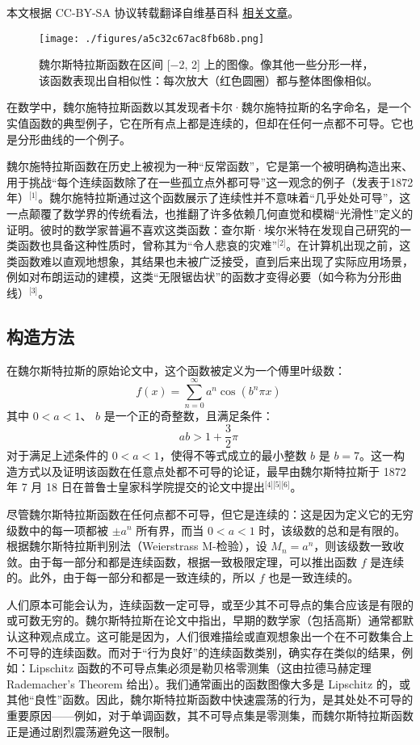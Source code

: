 
本文根据 CC-BY-SA 协议转载翻译自维基百科 \href{https://en.wikipedia.org/wiki/Weierstrass_function}{相关文章}。

\begin{figure}[ht]
\centering
\texttt{[image: ./figures/a5c32c67ac8fb68b.png]}
\caption{魏尔斯特拉斯函数在区间 [−2, 2] 上的图像。像其他一些分形一样，该函数表现出自相似性：每次放大（红色圆圈）都与整体图像相似。} \label{fig_WRST_1}
\end{figure}
在数学中，魏尔施特拉斯函数以其发现者卡尔·魏尔施特拉斯的名字命名，是一个实值函数的典型例子，它在所有点上都是连续的，但却在任何一点都不可导。它也是分形曲线的一个例子。

魏尔施特拉斯函数在历史上被视为一种“反常函数”，它是第一个被明确构造出来、用于挑战“每个连续函数除了在一些孤立点外都可导”这一观念的例子（发表于1872年）\(^\text{[1]}\)。魏尔施特拉斯通过这个函数展示了连续性并不意味着“几乎处处可导”，这一点颠覆了数学界的传统看法，也推翻了许多依赖几何直觉和模糊“光滑性”定义的证明。彼时的数学家普遍不喜欢这类函数：查尔斯·埃尔米特在发现自己研究的一类函数也具备这种性质时，曾称其为“令人悲哀的灾难”\(^\text{[2]}\)。在计算机出现之前，这类函数难以直观地想象，其结果也未被广泛接受，直到后来出现了实际应用场景，例如对布朗运动的建模，这类“无限锯齿状”的函数才变得必要（如今称为分形曲线）\(^\text{[3]}\)。
\subsection{构造方法}
在魏尔斯特拉斯的原始论文中，这个函数被定义为一个傅里叶级数：
$$
f(x) = \sum_{n=0}^{\infty} a^n \cos(b^n \pi x)~
$$
其中
$0 < a < 1$、
$b$ 是一个正的奇整数，且满足条件：
$$
ab > 1 + \frac{3}{2}\pi~
$$
对于满足上述条件的 $0 < a < 1$，使得不等式成立的最小整数 $b$ 是 $b = 7$。这一构造方式以及证明该函数在任意点处都不可导的论证，最早由魏尔斯特拉斯于 1872 年 7 月 18 日在普鲁士皇家科学院提交的论文中提出\(^\text{[4][5][6]}\)。

尽管魏尔斯特拉斯函数在任何点都不可导，但它是连续的：这是因为定义它的无穷级数中的每一项都被 $\pm a^n$ 所有界，而当 $0 < a < 1$ 时，该级数的总和是有限的。根据魏尔斯特拉斯判别法（Weierstrass M-检验），设 $M_n = a^n$，则该级数一致收敛。由于每一部分和都是连续函数，根据一致极限定理，可以推出函数 $f$ 是连续的。此外，由于每一部分和都是一致连续的，所以 $f$ 也是一致连续的。

人们原本可能会认为，连续函数一定可导，或至少其不可导点的集合应该是有限的或可数无穷的。魏尔斯特拉斯在论文中指出，早期的数学家（包括高斯）通常都默认这种观点成立。这可能是因为，人们很难描绘或直观想象出一个在不可数集合上不可导的连续函数。而对于“行为良好”的连续函数类别，确实存在类似的结果，例如：Lipschitz 函数的不可导点集必须是勒贝格零测集（这由拉德马赫定理 Rademacher's Theorem 给出）。我们通常画出的函数图像大多是 Lipschitz 的，或其他“良性”函数。因此，魏尔斯特拉斯函数中快速震荡的行为，是其处处不可导的重要原因——例如，对于单调函数，其不可导点集是零测集，而魏尔斯特拉斯函数正是通过剧烈震荡避免这一限制。

